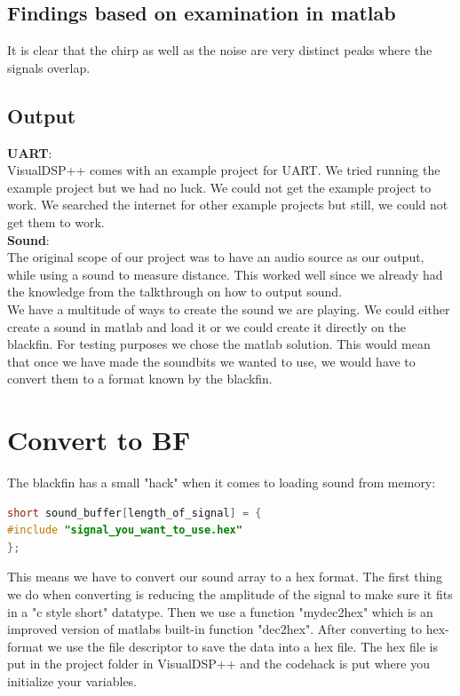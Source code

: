 \subsection{Findings based on examination in matlab}
It is clear that the chirp as well as the noise are very distinct peaks where the signals overlap. 
\subsection{Output}
\textbf{UART}:\\
VisualDSP++ comes with an example project for UART. We tried running the example project but we had no luck. We could not get the example project to work. We searched the internet for other example projects but still, we could not get them to work. \\
\textbf{Sound}:\\
The original scope of our project was to have an audio source as our output, while using a sound to measure distance. This worked well since we already had the knowledge from the talkthrough on how to output sound.\\
We have a multitude of ways to create the sound we are playing. We could either create a sound in matlab and load it or we could create it directly on the blackfin. For testing purposes we chose the matlab solution. This would mean that once we have made the soundbits we wanted to use, we would have to convert them to a format known by the blackfin.
\section{Convert to BF}
The blackfin has a small "hack" when it comes to loading sound from memory:
\begin{lstlisting}[language=C]
short sound_buffer[length_of_signal] = { 
#include "signal_you_want_to_use.hex"
};
\end{lstlisting}
This means we have to convert our sound array to a hex format. The first thing we do when converting is reducing the amplitude of the signal to make sure it fits in a "c style short" datatype. Then we use a function "mydec2hex" which is an improved version of matlabs built-in function "dec2hex". After converting to hex-format we use the file descriptor to save the data into a hex file. The hex file is put in the project folder in VisualDSP++ and the codehack is put where you initialize your variables.

